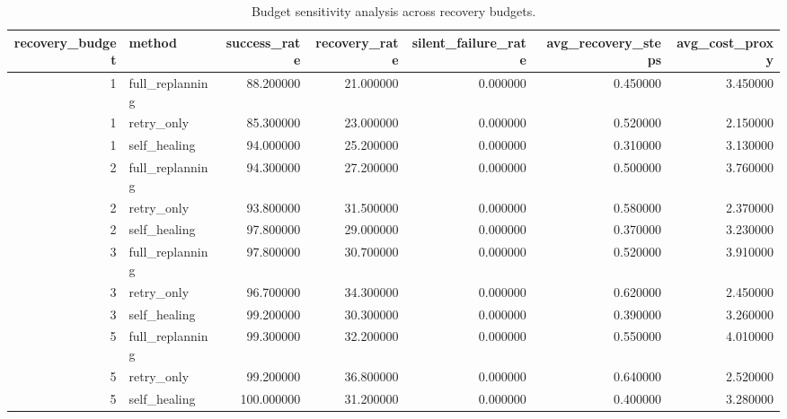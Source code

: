 \begin{table}
\caption{Budget sensitivity analysis across recovery budgets.}
\label{tab:budget_sensitivity}
\begin{tabular}{rlrrrrr}
\toprule
recovery_budget & method & success_rate & recovery_rate & silent_failure_rate & avg_recovery_steps & avg_cost_proxy \\
\midrule
1 & full_replanning & 88.200000 & 21.000000 & 0.000000 & 0.450000 & 3.450000 \\
1 & retry_only & 85.300000 & 23.000000 & 0.000000 & 0.520000 & 2.150000 \\
1 & self_healing & 94.000000 & 25.200000 & 0.000000 & 0.310000 & 3.130000 \\
2 & full_replanning & 94.300000 & 27.200000 & 0.000000 & 0.500000 & 3.760000 \\
2 & retry_only & 93.800000 & 31.500000 & 0.000000 & 0.580000 & 2.370000 \\
2 & self_healing & 97.800000 & 29.000000 & 0.000000 & 0.370000 & 3.230000 \\
3 & full_replanning & 97.800000 & 30.700000 & 0.000000 & 0.520000 & 3.910000 \\
3 & retry_only & 96.700000 & 34.300000 & 0.000000 & 0.620000 & 2.450000 \\
3 & self_healing & 99.200000 & 30.300000 & 0.000000 & 0.390000 & 3.260000 \\
5 & full_replanning & 99.300000 & 32.200000 & 0.000000 & 0.550000 & 4.010000 \\
5 & retry_only & 99.200000 & 36.800000 & 0.000000 & 0.640000 & 2.520000 \\
5 & self_healing & 100.000000 & 31.200000 & 0.000000 & 0.400000 & 3.280000 \\
\bottomrule
\end{tabular}
\end{table}
